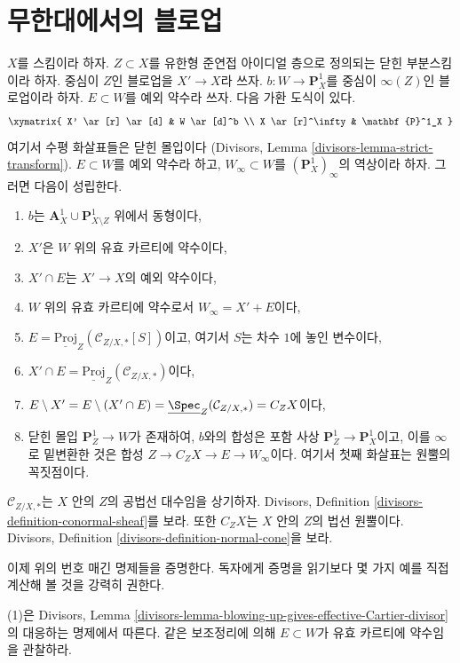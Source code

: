 \section{무한대에서의 블로업}
\label{section-blowup-Z-first}

\noindent
$X$를 스킴이라 하자. $Z \subset X$를 유한형 준연접 아이디얼 층으로
정의되는 닫힌 부분스킴이라 하자. 중심이 $Z$인 블로업을
$X' \to X$라 쓰자. $b : W \to \mathbf{P}^1_X$를 중심이
$\infty(Z)$인 블로업이라 하자. $E \subset W$를 예외 약수라 쓰자.
다음 가환 도식이 있다.
$$
\xymatrix{
X' \ar[r] \ar[d] & W \ar[d]^b \\
X \ar[r]^\infty & \mathbf{P}^1_X
}
$$
여기서 수평 화살표들은 닫힌 몰입이다
(Divisors, Lemma \ref{divisors-lemma-strict-transform}). $E \subset W$를
예외 약수라 하고, $W_\infty \subset W$를
$(\mathbf{P}^1_X)_\infty$의 역상이라 하자. 그러면 다음이 성립한다.
\begin{enumerate}
\item $b$는 $\mathbf{A}^1_X \cup \mathbf{P}^1_{X \setminus Z}$ 위에서
동형이다,
\item $X'$은 $W$ 위의 유효 카르티에 약수이다,
\item $X' \cap E$는 $X' \to X$의 예외 약수이다,
\item $W$ 위의 유효 카르티에 약수로서 $W_\infty = X' + E$이다,
\item $E = \underline{\text{Proj}}_Z(\mathcal{C}_{Z/X, *}[S])$이고, 여기서
$S$는 차수 $1$에 놓인 변수이다,
\item $X' \cap E = \underline{\text{Proj}}_Z(\mathcal{C}_{Z/X, *})$이다,
\item
\label{item-cone-is-open}
$E \setminus X' = E \setminus (X' \cap E) =
\underline{\Spec}_Z(\mathcal{C}_{Z/X, *}) = C_ZX$이다,
\item
\label{item-find-Z-in-blowup}
닫힌 몰입 $\mathbf{P}^1_Z \to W$가 존재하여, $b$와의 합성은 포함 사상
$\mathbf{P}^1_Z \to \mathbf{P}^1_X$이고, 이를 $\infty$로 밑변환한 것은
합성 $Z \to C_ZX \to E \to W_\infty$이다. 여기서 첫째 화살표는
원뿔의 꼭짓점이다.
\end{enumerate}
$\mathcal{C}_{Z/X, *}$는 $X$ 안의 $Z$의 공법선 대수임을 상기하자.
Divisors, Definition \ref{divisors-definition-conormal-sheaf}를 보라.
또한 $C_ZX$는 $X$ 안의 $Z$의 법선 원뿔이다. Divisors, Definition
\ref{divisors-definition-normal-cone}을 보라.

\medskip\noindent
이제 위의 번호 매긴 명제들을 증명한다. 독자에게 증명을 읽기보다
몇 가지 예를 직접 계산해 볼 것을 강력히 권한다.

\medskip\noindent
(1)은 Divisors, Lemma
\ref{divisors-lemma-blowing-up-gives-effective-Cartier-divisor}의 대응하는
명제에서 따른다. 같은 보조정리에 의해 $E \subset W$가 유효 카르티에
약수임을 관찰하라.

